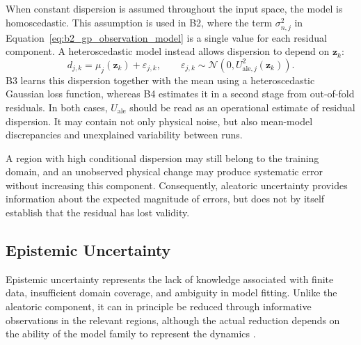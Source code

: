 \documentclass[12pt,a4paper]{report}
\begin{document}
When constant dispersion is assumed throughout the input space, the model is homoscedastic. This assumption is used in B2, where the term $\sigma_{n,j}^{2}$ in Equation~\eqref{eq:b2_gp_observation_model} is a single value for each residual component. A heteroscedastic model instead allows dispersion to depend on $\mathbf{z}_k$:
\begin{equation}
    d_{j,k}
    =
    \mu_j(\mathbf{z}_k)
    +
    \varepsilon_{j,k},
    \qquad
    \varepsilon_{j,k}\sim
    \mathcal{N}\!\left(0,U^2_{\mathrm{ale},j}(\mathbf{z}_k)\right).
    \label{eq:heteroscedastic_residual_model}
\end{equation}
B3 learns this dispersion together with the mean using a heteroscedastic Gaussian loss function, whereas B4 estimates it in a second stage from out-of-fold residuals. In both cases, $U_{\mathrm{ale}}$ should be read as an operational estimate of residual dispersion. It may contain not only physical noise, but also mean-model discrepancies and unexplained variability between runs.

A region with high conditional dispersion may still belong to the training domain, and an unobserved physical change may produce systematic error without increasing this component. Consequently, aleatoric uncertainty provides information about the expected magnitude of errors, but does not by itself establish that the residual has lost validity.

\subsection{Epistemic Uncertainty}


Epistemic uncertainty represents the lack of knowledge associated with finite data, insufficient domain coverage, and ambiguity in model fitting. Unlike the aleatoric component, it can in principle be reduced through informative observations in the relevant regions, although the actual reduction depends on the ability of the model family to represent the dynamics \cite{Brunke2022Safe}.
\end{document}
